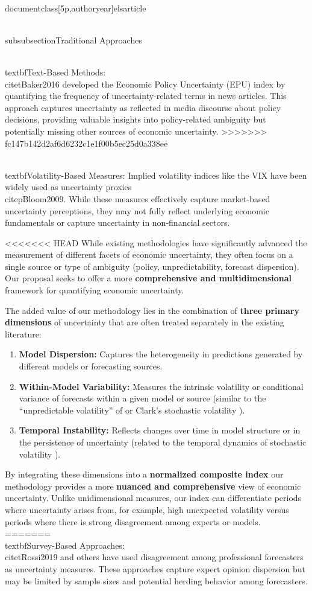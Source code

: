 \\documentclass[5p,authoryear]{elsarticle}
\begin{document}
{\\subsubsection{Traditional Approaches}

\\textbf{Text-Based Methods:} \\citet{Baker2016} developed the Economic Policy Uncertainty (EPU) index by quantifying the frequency of uncertainty-related terms in news articles. This approach captures uncertainty as reflected in media discourse about policy decisions, providing valuable insights into policy-related ambiguity but potentially missing other sources of economic uncertainty.
>>>>>>> fc147b142d2af6d6232c1e1f00b5ec25d0a338ee

\\textbf{Volatility-Based Measures:} Implied volatility indices like the VIX have been widely used as uncertainty proxies \\citep{Bloom2009}. While these measures effectively capture market-based uncertainty perceptions, they may not fully reflect underlying economic fundamentals or capture uncertainty in non-financial sectors.

<<<<<<< HEAD
While existing methodologies have significantly advanced the measurement of different facets of economic uncertainty, they often focus on a single source or type of ambiguity (policy, unpredictability, forecast dispersion). Our proposal seeks to offer a more \textbf{comprehensive and multidimensional} framework for quantifying economic uncertainty.

The added value of our methodology lies in the combination of \textbf{three primary dimensions} of uncertainty that are often treated separately in the existing literature:
\begin{enumerate}
    \item \textbf{Model Dispersion:} Captures the heterogeneity in predictions generated by different models or forecasting sources.
    \item \textbf{Within-Model Variability:} Measures the intrinsic volatility or conditional variance of forecasts within a given model or source (similar to the ``unpredictable volatility'' of \cite{jurado2015} or Clark's stochastic volatility \cite{clark2017}).
    \item \textbf{Temporal Instability:} Reflects changes over time in model structure or in the persistence of uncertainty (related to the temporal dynamics of stochastic volatility \cite{clark2017}).
\end{enumerate}

By integrating these dimensions into a \textbf{normalized composite index} our methodology provides a more \textbf{nuanced and comprehensive} view of economic uncertainty. Unlike unidimensional measures, our index can differentiate periods where uncertainty arises from, for example, high unexpected volatility versus periods where there is strong disagreement among experts or models.
=======
\\textbf{Survey-Based Approaches:} \\citet{Rossi2019} and others have used disagreement among professional forecasters as uncertainty measures. These approaches capture expert opinion dispersion but may be limited by sample sizes and potential herding behavior among forecasters.

}
\end{document}
